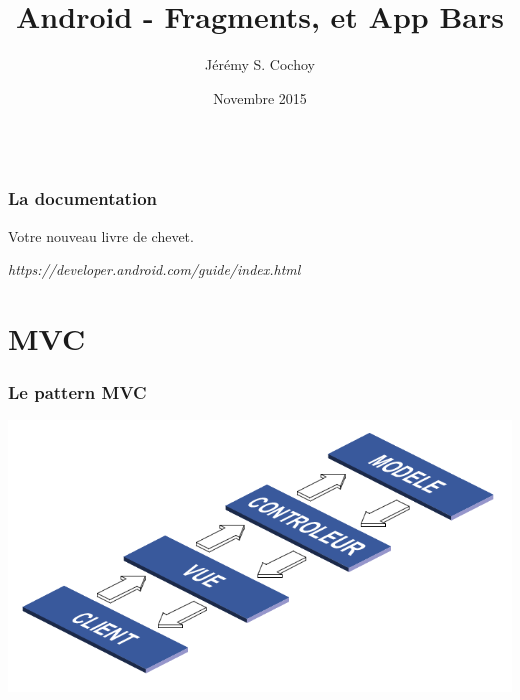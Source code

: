 \documentclass{beamer}
\begin{document}
\title{Android - Fragments, et App Bars}
\author{Jérémy S. Cochoy}
\date{Novembre 2015}


\begin{frame}
\titlepage
\end{frame}

\begin{frame}
  \begin{columns}[t]
  \begin{column}{5cm}
  \tableofcontents[sections={1-3}]
  \end{column}
  \begin{column}{5cm}
  \tableofcontents[sections={4-8}]
  \end{column}
  \end{columns}
\end{frame}

\begin{frame}
\frametitle{La documentation}

\begin{block}{Votre nouveau livre de chevet.}
\begin{center}
\emph{https://developer.android.com/guide/index.html}
\end{center}
\end{block}

\end{frame}

\section{MVC}

\begin{frame}
\frametitle{Le pattern MVC}
\begin{center}
\includegraphics[scale=0.4]{mvc_intro.png}
\end{center}
\end{frame}
\end{document}
